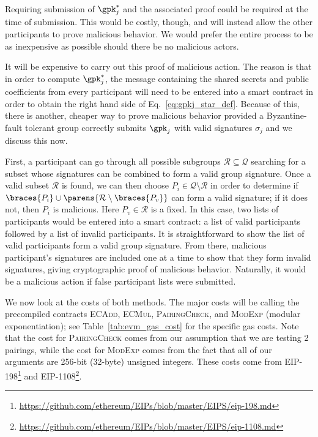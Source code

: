 \noindent
Requiring submission of $\gpk_{j}^{*}$ and the associated
proof could be required at the time of submission.
This would be costly, though, and will instead allow
the other participants to prove malicious behavior.
We would prefer the entire process to be as inexpensive
as possible should there be no malicious actors.

It will be expensive to carry out this proof of malicious action.
The reason is that in order to compute $\gpk_{j}^{*}$,
the message containing the shared secrets and public coefficients
from every participant will need to be entered into a smart contract
in order to obtain the right hand side of
Eq.~\eqref{eq:gpkj_star_def}.
Because of this, there is another, cheaper way to prove malicious
behavior provided a Byzantine-fault tolerant group
correctly submits $\gpk_{j}$ with valid signatures $\sigma_{j}$
and we discuss this now.

First, a participant can go through all possible subgroups
$\mathcal{R}\subseteq\mathcal{Q}$ searching for a subset
whose signatures can be combined to form a valid
group signature.
Once a valid subset $\mathcal{R}$ is found,
we can then choose $P_{i}\in\mathcal{Q}\setminus\mathcal{R}$
in order to determine if
$\braces{P_{i}}\cup\parens{\mathcal{R}\setminus \braces{P_{v}}}$
can form a valid signature;
if it does not, then $P_{i}$ is malicious.
Here $P_{v}\in\mathcal{R}$ is a fixed.
In this case, two lists of participants would be entered into a smart
contract: a list of valid participants followed by a list of
invalid participants.
It is straightforward to show the list of valid
participants form a valid group signature.
From there, malicious participant's signatures are included 
one at a time to show that they form invalid signatures,
giving cryptographic proof of malicious behavior.
Naturally, it would be a malicious action if false participant
lists were submitted.

We now look at the costs of both methods.
The major costs will be calling the precompiled contracts
\textsc{ECAdd}, \textsc{ECMul}, \textsc{PairingCheck},
and \textsc{ModExp} (modular exponentiation);
see Table~\ref{tab:evm_gas_cost} for the specific gas costs.
Note that the cost for \textsc{PairingCheck} comes
from our assumption that we are testing 2 pairings,
while the cost for \textsc{ModExp} comes from the fact
that all of our arguments are 256-bit (32-byte) unsigned integers.
These costs come from EIP-198\footnote{
    \url{https://github.com/ethereum/EIPs/blob/master/EIPS/eip-198.md}}
and EIP-1108\footnote{
    \url{https://github.com/ethereum/EIPs/blob/master/EIPS/eip-1108.md}}.

